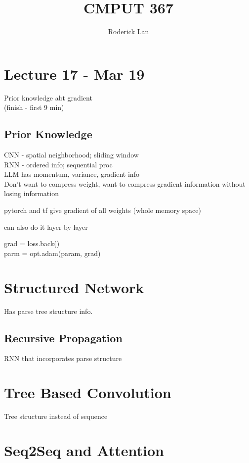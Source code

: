 \documentclass{article}
\title{CMPUT 367}
\author{Roderick Lan}
\date{}
\begin{document}
\maketitle

\tableofcontents
\break

\section*{Lecture 17 - Mar 19}
Prior knowledge abt gradient
\\
(finish - first 9 min)


\subsection{Prior Knowledge}
CNN - spatial neighborhood; sliding window
\\
RNN - ordered info; sequential proc
\\
LLM has momentum, variance, gradient info
\\[10pt]
Don't want to compress weight, want to compress gradient information without losing information
\begin{list}{}{}
    \item pytorch and tf give gradient of all weights (whole memory space)
    \item can also do it layer by layer
\end{list}
\noindent
grad = loss.back()
\\
parm = opt.adam(param, grad)


\section{Structured Network}
Has parse tree structure info.

\subsection{Recursive Propagation}
RNN that incorporates parse structure 


\section{Tree Based Convolution}
Tree structure instead of sequence



\section{Seq2Seq and Attention}
\end{document}
